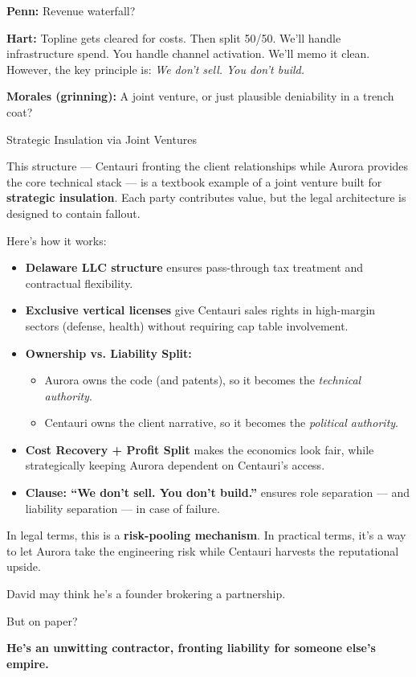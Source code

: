 \textbf{Penn:}
Revenue waterfall?

\textbf{Hart:}
Topline gets cleared for costs. Then split 50/50.
We’ll handle infrastructure spend. You handle channel activation.
We’ll memo it clean. However, the key principle is:
\textit{We don’t sell. You don’t build.}

\textbf{Morales (grinning):}
A joint venture, or just plausible deniability in a trench coat?

\medskip

\begin{TechnicalSidebar}{Strategic Insulation via Joint Ventures}

  This structure — Centauri fronting the client relationships while Aurora provides the core technical stack — is a 
  textbook example of a joint venture built for \textbf{strategic insulation}. Each party contributes value, but the 
  legal architecture is designed to contain fallout.
  
  \medskip
  
  Here’s how it works:

  \medskip
  
  \begin{itemize}
    \item \textbf{Delaware LLC structure} ensures pass-through tax treatment and contractual flexibility.
    \item \textbf{Exclusive vertical licenses} give Centauri sales rights in high-margin sectors (defense, health) without 
    requiring cap table involvement.
    \item \textbf{Ownership vs. Liability Split:}
      \begin{itemize}
        \item Aurora owns the code (and patents), so it becomes the \textit{technical authority}.
        \item Centauri owns the client narrative, so it becomes the \textit{political authority}.
      \end{itemize}
    \item \textbf{Cost Recovery + Profit Split} makes the economics look fair, while strategically keeping Aurora dependent 
    on Centauri’s access.
    \item \textbf{Clause: “We don’t sell. You don’t build.”} ensures role separation — and liability separation — in case 
    of failure.
  \end{itemize}
  
  \medskip
  
  In legal terms, this is a \textbf{risk-pooling mechanism}. In practical terms, it’s a way to let Aurora take the engineering 
  risk while Centauri harvests the reputational upside.
  
  \medskip
  
  David may think he’s a founder brokering a partnership.

  \medskip
  
  But on paper?

  \medskip
  
  \textbf{He’s an unwitting contractor, fronting liability for someone else’s empire.}
  
\end{TechnicalSidebar}


